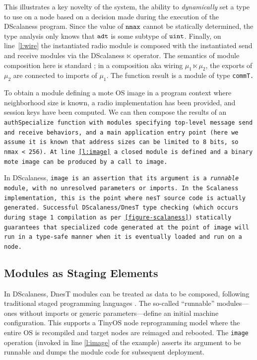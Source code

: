 This illustrates a key novelty of the system, the ability to \emph{dynamically} set a type to
use on a node based on a decision made during the execution of the DScalaness program. Since the
value of $\tt{nmax}$ cannot be statically determined, the type analysis only knows that
$\tt{adt}$ is some subtype of $\tt{uint}$. Finally, on line~\ref{l:wire} the instantiated radio
module is composed with the instantiated send and receive modules via the DScalaness $\ltimes$
operator. The semantics of module composition here is standard \cite{Cardelli-1997}; in a
composition aka wiring $\mu_1 \ltimes \mu_2$, the exports of $\mu_2$ are connected to imports of
$\mu_1$. The function result is a module of type \tt{commT}.

To obtain a module defining a mote OS image in a program context where neighborhood size is
known, a radio implementation has been provided, and session keys have been computed. We can
then compose the results of an \tt{authSpecialize} function with modules specifying top-level
message send and receive behaviors, and a \texttt{main} application entry point (here we assume
it is known that address sizes can be limited to 8 bits, so \tt{nmax} < 256). At line
\ref{l:image} a closed module is defined and a binary mote image can be produced by a call to
\tt{image}.

In DScalaness, \tt{image} is an assertion that its argument is a \emph{runnable} module, with no
unresolved parameters or imports. In the Scalaness implementation, this is the point where nesT
source code is actually generated. Successful DScalaness/DnesT type checking (which occurs
during stage 1 compilation as per \autoref{figure-scalaness}) statically guarantees that
specialized code generated at the point of \tt{image} will run in a type-safe manner when it is
eventually loaded and run on a node.

\subsection{Modules as Staging Elements}

In DScalaness, DnesT modules can be treated as data to be composed, following traditional staged
programming languages \cite{Taha-MetaML}. The so-called ``runnable'' modules---ones without
imports or generic parameters---define an initial machine configuration. This supports a TinyOS
node reprogramming model where the entire OS is recompiled and target nodes are reimaged and
rebooted. The \texttt{image} operation (invoked in line \ref{l:image} of the example) asserts
its argument to be runnable and dumps the module code for subsequent deployment.

